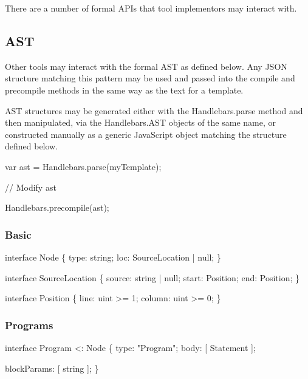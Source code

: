 There are a number of formal A\+P\+Is that tool implementors may interact with.

\subsection*{A\+ST}

Other tools may interact with the formal A\+ST as defined below. Any J\+S\+ON structure matching this pattern may be used and passed into the {\ttfamily compile} and {\ttfamily precompile} methods in the same way as the text for a template.

A\+ST structures may be generated either with the {\ttfamily Handlebars.\+parse} method and then manipulated, via the {\ttfamily Handlebars.\+A\+ST} objects of the same name, or constructed manually as a generic Java\+Script object matching the structure defined below.


\begin{DoxyCode}
var ast = Handlebars.parse(myTemplate);

// Modify ast

Handlebars.precompile(ast);
\end{DoxyCode}


\subsubsection*{Basic}


\begin{DoxyCode}
\textcolor{keyword}{interface }Node \{
    type: string;
    loc: SourceLocation | null;
\}

\textcolor{keyword}{interface }SourceLocation \{
    source: \textcolor{keywordtype}{string} | null;
    start: Position;
    end: Position;
\}

\textcolor{keyword}{interface }Position \{
    line: uint >= 1;
    column: uint >= 0;
\}
\end{DoxyCode}


\subsubsection*{Programs}


\begin{DoxyCode}
\textcolor{keyword}{interface }Program <: Node \{
    type: \textcolor{stringliteral}{"Program"};
    body: [ Statement ];

    blockParams: [ string ];
\}
\end{DoxyCode}


